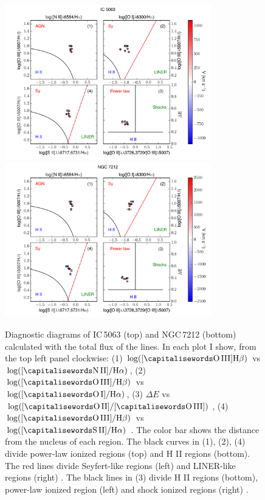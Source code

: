 \documentclass[../main.tex]{subfiles}
\begin{document}
\begin{figure} 
\centering
\includegraphics[width=0.8\textwidth]{images/paper1/IC5063_diag.pdf}\\
\includegraphics[width=0.8\textwidth]{images/paper1/NGC7212_diag.pdf}\\
\caption[]{Diagnostic diagrams of IC\,5063 (top) and NGC\,7212 (bottom) calculated with the total flux of the lines.  In each plot I show, from the top left panel clockwise: (1) $\log([\rm\ion{O}{III}] \Hb)$ vs $\log([\rm\ion{N}{II}]/ \Ha)$, (2) $\log([\rm\ion{O}{III}]/ \Hb)$ vs $\log([\rm\ion{O}{I}]/ \Ha)$, (3) $\Delta E$ vs $\log([\rm\ion{O}{II}]/[\rm\ion{O}{III}])$, (4) $\log([\rm\ion{O}{III}]/ \Hb)$ vs $\log([\rm\ion{S}{II}]/ \Ha)$ \citep{Baldwin81, Veilleux87}. The color bar shows the distance from the nucleus of each region. The black curves in (1), (2), (4) divide power-law ionized regions (top) and H II regions (bottom). The red lines divide Seyfert-like regions (left) and LINER-like regions (right) \citep{Kewley06}. The black lines in (3) divide H II regions (bottom), power-law ionized region (left) and shock ionized regions (right) \citep{Baldwin81}.  }
\label{fig:diag_estot}
\end{figure}
\end{document}
